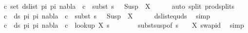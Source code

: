 \begin{isabellebody}
\ {\isachardoublequoteopen}{\isasymforall}c{\isasymin}\ set\ {\isacharparenleft}{\kern0pt}ds{\isacharunderscore}{\kern0pt}list\ pi{}\ pi{}{\isacharparenright}{\kern0pt}{\isachardot}{\kern0pt}\ nabla{}\ {\isasymturnstile}\ c\ {\isasymsharp}\ subst\ {\isacharparenleft}{\kern0pt}s{}\ {\isasymbullet}\ {\isacharbrackleft}{\kern0pt}{\isacharbrackright}{\kern0pt}{\isacharparenright}{\kern0pt}\ {\isacharparenleft}{\kern0pt}Susp\ {\isacharbrackleft}{\kern0pt}{\isacharbrackright}{\kern0pt}\ X{\isacharparenright}{\kern0pt}{\isachardoublequoteclose}\isanewline
\ \ \ \ \isamarkupfalse%
\ {\isacharparenleft}{\kern0pt}auto\ split{\isacharcolon}{\kern0pt}\ prod{\isachardot}{\kern0pt}splits{\isacharparenright}{\kern0pt}\isanewline
\ \ \isamarkupfalse%
\ {\isachardoublequoteopen}{\isasymforall}c\ {\isasymin}\ ds\ pi{}\ pi{}{\isachardot}{\kern0pt}\ nabla{}\ {\isasymturnstile}\ c\ {\isasymsharp}\ subst\ {\isacharparenleft}{\kern0pt}s{}\ {\isasymbullet}\ {\isacharbrackleft}{\kern0pt}{\isacharbrackright}{\kern0pt}{\isacharparenright}{\kern0pt}\ {\isacharparenleft}{\kern0pt}Susp\ {\isacharbrackleft}{\kern0pt}{\isacharbrackright}{\kern0pt}\ X{\isacharparenright}{\kern0pt}{\isachardoublequoteclose}\isanewline
\ \ \ \ \isamarkupfalse%
\ ds{\isacharunderscore}{\kern0pt}list{\isacharunderscore}{\kern0pt}equ{\isacharunderscore}{\kern0pt}ds\ \isamarkupfalse%
\ simp\isanewline
\ \ \isamarkupfalse%
\ {\isachardoublequoteopen}{\isasymforall}c\ {\isasymin}\ ds\ pi{}\ pi{}{\isachardot}{\kern0pt}\ nabla{}\ {\isasymturnstile}\ c\ {\isasymsharp}\ {\isacharparenleft}{\kern0pt}look{\isacharunderscore}{\kern0pt}up\ X\ {\isacharparenleft}{\kern0pt}s{}\ {\isasymbullet}\ {\isacharbrackleft}{\kern0pt}{\isacharbrackright}{\kern0pt}{\isacharparenright}{\kern0pt}{\isacharparenright}{\kern0pt}{\isachardoublequoteclose}\isanewline
\ \ \ \ \isamarkupfalse%
\ subst{\isacharunderscore}{\kern0pt}susp{\isacharbrackleft}{\kern0pt}of\ {\isacartoucheopen}{\isacharparenleft}{\kern0pt}s{}\ {\isasymbullet}\ {\isacharbrackleft}{\kern0pt}{\isacharbrackright}{\kern0pt}{\isacharparenright}{\kern0pt}{\isacartoucheclose}\ {\isacartoucheopen}{\isacharbrackleft}{\kern0pt}{\isacharbrackright}{\kern0pt}{\isacartoucheclose}\ X{\isacharbrackright}{\kern0pt}\ swap{\isacharunderscore}{\kern0pt}id\ \isamarkupfalse%
\ simp\isanewline
\ \ \isamarkupfalse%

\end{isabellebody}
